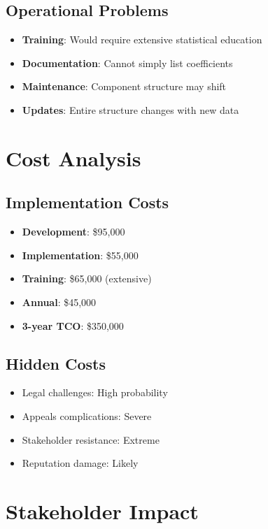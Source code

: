 \subsection{Operational Problems}

\begin{itemize}
    \item \textbf{Training}: Would require extensive statistical education
    \item \textbf{Documentation}: Cannot simply list coefficients
    \item \textbf{Maintenance}: Component structure may shift
    \item \textbf{Updates}: Entire structure changes with new data
\end{itemize}

\section{Cost Analysis}

\subsection{Implementation Costs}

\begin{itemize}
    \item \textbf{Development}: \$95,000
    \item \textbf{Implementation}: \$55,000
    \item \textbf{Training}: \$65,000 (extensive)
    \item \textbf{Annual}: \$45,000
    \item \textbf{3-year TCO}: \$350,000
\end{itemize}

\subsection{Hidden Costs}

\begin{itemize}
    \item Legal challenges: High probability
    \item Appeals complications: Severe
    \item Stakeholder resistance: Extreme
    \item Reputation damage: Likely
\end{itemize}

\section{Stakeholder Impact}

